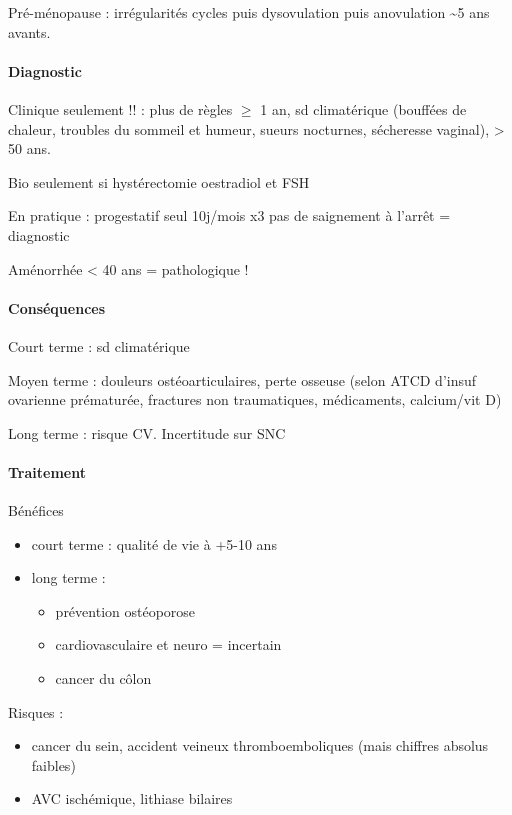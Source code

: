 \documentclass[11pt]{article}
\begin{document}
Pré-ménopause : irrégularités cycles puis dysovulation puis anovulation \textasciitilde{}5 ans
avants.

\paragraph{Diagnostic}
\label{sec:orgb140481}
Clinique seulement !! : plus de règles \(\ge\) 1 an, sd climatérique (bouffées de chaleur, troubles du
sommeil et humeur, sueurs nocturnes, sécheresse vaginal), \female > 50 ans. 

Bio seulement si hystérectomie \thus \dec oestradiol et \inc FSH

En pratique : progestatif seul 10j/mois x3 \thus pas de saignement à l'arrêt =
diagnostic

Aménorrhée < 40 ans = pathologique !

\paragraph{Conséquences}
\label{sec:org9030aff}
Court terme : sd climatérique

Moyen terme : douleurs ostéoarticulaires, \inc perte osseuse (selon ATCD d'insuf
ovarienne prématurée, fractures non traumatiques, médicaments, calcium/vit D)

Long terme : \inc risque CV. Incertitude sur SNC

\paragraph{Traitement}
\label{sec:org43c2829}
Bénéfices
\begin{itemize}
\item court terme : qualité de vie à +5-10 ans
\item long terme :
\begin{itemize}
\item prévention ostéoporose
\item cardiovasculaire et neuro = incertain
\item cancer du côlon
\end{itemize}
\end{itemize}
Risques :
\begin{itemize}
\item \inc cancer du sein, accident veineux thromboemboliques (mais chiffres absolus
faibles)
\item \inc AVC ischémique, lithiase bilaires
\end{itemize}
\end{document}
